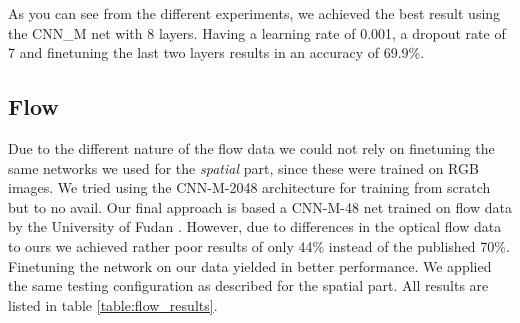 As you can see from the different experiments, we achieved the best result using the CNN\_M net with 8 layers.
Having a learning rate of 0.001, a dropout rate of 7 and finetuning the last two layers results in an accuracy of 69.9\%.



\subsection{Flow}
\label{subsec:flow}
Due to the different nature of the flow data we could not rely on finetuning the same networks we used for the \emph{spatial} part, since these were trained on RGB images.
We tried using the CNN-M-2048 architecture for training from scratch but to no avail.
Our final approach is based a CNN-M-48 net trained on flow data by the University of Fudan \cite{wu2015modeling}.
However, due to differences in the optical flow data to ours we achieved rather poor results of only 44\% instead of the published 70\%. 
Finetuning the network on our data yielded in better performance.
We applied the same testing configuration as described for the spatial part.
All results are listed in table \ref{table:flow_results}.

